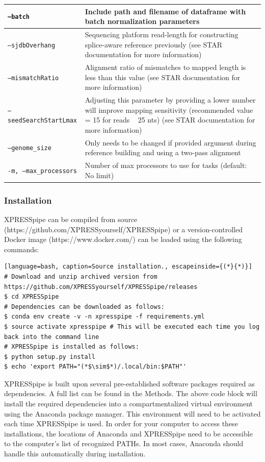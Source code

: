 \documentclass[11pt, a4paper, oneside]{article}
\begin{document}
\begin{tabular}{p{5cm}p{13cm}}
 \hline
 \texttt{--batch} & Include path and filename of dataframe with batch normalization parameters \\
 \hline
 \texttt{--sjdbOverhang} & Sequencing platform read-length for constructing splice-aware reference previously (see STAR documentation for more information) \\
 \hline
 \texttt{--mismatchRatio} & Alignment ratio of mismatches to mapped length is less than this value (see STAR documentation for more information) \\
 \hline
 \texttt{--seedSearchStartLmax} & Adjusting this parameter by providing a lower number will improve mapping sensitivity (recommended value = 15 for reads ~ 25 nts) (see STAR documentation for more information) \\
 \hline
 \texttt{--genome\_size} & Only needs to be changed if provided argument during reference building and using a two-pass alignment \\
 \hline
 \texttt{-m, --max\_processors} & Number of max processors to use for tasks (default: No limit) \\
\end{tabular}
\newline

\subsubsection{Installation}
XPRESSpipe can be compiled from source (https://github.com/XPRESSyourself/XPRESSpipe) or a version-controlled Docker image (https://www.docker.com/) can be loaded using the following commands: \par

\begin{lstlisting}[language=bash, caption=Source installation., escapeinside={(*}{*)}]
# Download and unzip archived version from https://github.com/XPRESSyourself/XPRESSpipe/releases
$ cd XPRESSpipe
# Dependencies can be downloaded as follows:
$ conda env create -v -n xpresspipe -f requirements.yml
$ source activate xpresspipe # This will be executed each time you log back into the command line
# XPRESSpipe is installed as follows:
$ python setup.py install
$ echo 'export PATH="(*$\sim$*)/.local/bin:$PATH"'
\end{lstlisting}

XPRESSpipe is built upon several pre-established software packages required as dependencies. A full list can be found in the Methods. The above code block will install the required dependencies into a compartmentalized virtual environment using the Anaconda package manager. This environment will need to be activated each time XPRESSpipe is used. In order for your computer to access these installations, the locations of Anaconda and XPRESSpipe need to be accessible to the computer's list of recognized PATHs. In most cases, Anaconda should handle this automatically during installation.
\end{document}
